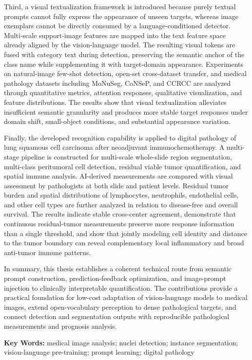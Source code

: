 Third, a visual textualization framework is introduced because purely textual prompts cannot fully express the appearance of unseen targets, whereas image exemplars cannot be directly consumed by a language-conditioned detector. Multi-scale support-image features are mapped into the text feature space already aligned by the vision-language model. The resulting visual tokens are fused with category text during detection, preserving the semantic anchor of the class name while supplementing it with target-domain appearance. Experiments on natural-image few-shot detection, open-set cross-dataset transfer, and medical pathology datasets including MoNuSeg, CoNSeP, and CCRCC are analyzed through quantitative metrics, attention responses, qualitative visualization, and feature distributions. The results show that visual textualization alleviates insufficient semantic granularity and produces more stable target responses under domain shift, small-object conditions, and substantial appearance variation.

Finally, the developed recognition capability is applied to digital pathology of lung squamous cell carcinoma after neoadjuvant immunochemotherapy. A multi-stage pipeline is constructed for multi-scale whole-slide region segmentation, multi-class peritumoral cell detection, residual viable tumor quantification, and spatial immune analysis. AI-derived measurements are compared with visual assessment by pathologists at both slide and patient levels. Residual tumor burden and spatial distributions of lymphocytes, neutrophils, endothelial cells, and other cell types are further analyzed in relation to disease-free and overall survival. The results indicate stable cross-center agreement, demonstrate that continuous residual-tumor measurements preserve more response information than a single threshold, and show that jointly modeling cell identity and distance to the tumor boundary can reveal complementary local inflammatory and broad anti-tumor immune patterns.

In summary, this thesis establishes a coherent technical route from semantic prompt construction, prediction-feedback optimization, and image-prompt injection to clinically interpretable quantification. The contributions provide a practical foundation for low-cost adaptation of vision-language models to medical images, extend open-vocabulary perception to dense pathological targets, and connect detection and segmentation outputs with reproducible pathological measurements and prognosis analysis.

\noindent\textbf{Key Words:} medical image analysis; nuclei detection; instance segmentation; vision-language pre-training; prompt learning; digital pathology
